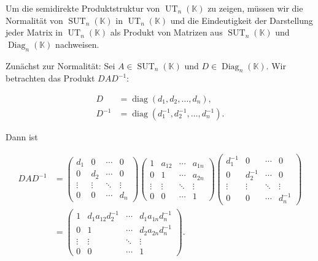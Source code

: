 Um die semidirekte Produktstruktur von $\operatorname{UT}_n(\mathbb{K})$ zu zeigen, müssen wir die Normalität von $\operatorname{SUT}_n(\mathbb{K})$ in $\operatorname{UT}_n(\mathbb{K})$ und die Eindeutigkeit der Darstellung jeder Matrix in $\operatorname{UT}_n(\mathbb{K})$ als Produkt von Matrizen aus $\operatorname{SUT}_n(\mathbb{K})$ und $\operatorname{Diag}_n(\mathbb{K})$ nachweisen.

Zunächst zur Normalität: Sei $A \in \operatorname{SUT}_n(\mathbb{K})$ und $D \in \operatorname{Diag}_n(\mathbb{K})$. Wir betrachten das Produkt $DAD^{-1}$:

\begin{align*}
D &= \operatorname{diag}(d_1, d_2, \ldots, d_n), \\
D^{-1} &= \operatorname{diag}(d_1^{-1}, d_2^{-1}, \ldots, d_n^{-1}).
\end{align*}

Dann ist

\begin{align*}
DAD^{-1} &= \begin{pmatrix}
d_1 & 0 & \cdots & 0 \\
0 & d_2 & \cdots & 0 \\
\vdots & \vdots & \ddots & \vdots \\
0 & 0 & \cdots & d_n
\end{pmatrix}
\begin{pmatrix}
1 & a_{12} & \cdots & a_{1n} \\
0 & 1 & \cdots & a_{2n} \\
\vdots & \vdots & \ddots & \vdots \\
0 & 0 & \cdots & 1
\end{pmatrix}
\begin{pmatrix}
d_1^{-1} & 0 & \cdots & 0 \\
0 & d_2^{-1} & \cdots & 0 \\
\vdots & \vdots & \ddots & \vdots \\
0 & 0 & \cdots & d_n^{-1}
\end{pmatrix} \\
&= \begin{pmatrix}
1 & d_1 a_{12} d_2^{-1} & \cdots & d_1 a_{1n} d_n^{-1} \\
0 & 1 & \cdots & d_2 a_{2n} d_n^{-1} \\
\vdots & \vdots & \ddots & \vdots \\
0 & 0 & \cdots & 1
\end{pmatrix}.
\end{align*}

